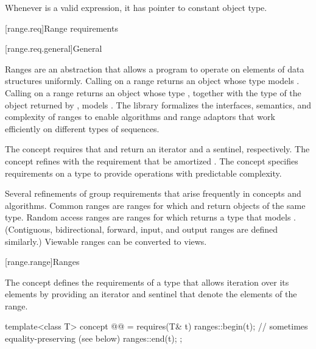 \pnum
\begin{note}
Whenever  is a valid expression, it
has pointer to constant object type.
\end{note}

[range.req]{Range requirements}

[range.req.general]{General}

\pnum
Ranges are an abstraction that allows a \Cpp{} program
to operate on elements of data structures uniformly.
Calling  on a range returns an object
whose type models .
Calling  on a range returns an object whose type ,
together with the type  of the object returned by ,
models .
The library formalizes the interfaces, semantics, and complexity of ranges
to enable algorithms and range adaptors that work efficiently
on different types of sequences.

\pnum
The  concept requires that
 and 
return an iterator and a sentinel, respectively.
The  concept refines  with
the requirement that  be amortized .
The  concept specifies requirements on
a  type to provide operations with predictable complexity.

\pnum
Several refinements of  group requirements
that arise frequently in concepts and algorithms.
Common ranges are ranges for which
 and 
return objects of the same type.
Random access ranges are ranges for which 
returns a type that models
.
(Contiguous, bidirectional, forward, input, and output ranges
are defined similarly.)
Viewable ranges can be converted to views.

[range.range]{Ranges}

\pnum
The  concept defines the requirements of a type that allows
iteration over its elements by providing an iterator and sentinel
that denote the elements of the range.

\begin{itemdecl}
template<class T>
  concept @@ =
    requires(T& t) {
      ranges::begin(t);         // sometimes equality-preserving (see below)
      ranges::end(t);
    };
\end{itemdecl}

